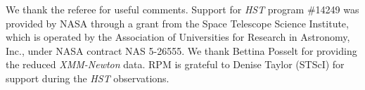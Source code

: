 \documentclass[pdftex,twocolumn]{aastex62}
\newcommand{\yus}[1]{{\color[rgb]{0.5,0.1,0.5}YS: #1}}
\newcommand{\gp}[1]{{\color{blue} #1}}
\begin{document}
\acknowledgments
 We thank the referee 
for useful comments. %
Support for \textit {HST}
program \#14249 was provided by NASA through a grant from
the Space Telescope Science Institute, which is operated by the
Association of Universities for Research in Astronomy, Inc.,
under NASA contract NAS 5-26555.
We thank Bettina Posselt for providing the reduced {\sl XMM-Newton} data. RPM is grateful to Denise Taylor (STScI) for support during the \textit{HST}  observations.







   
\end{document}

